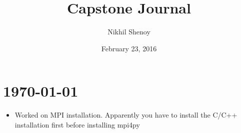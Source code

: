\documentclass{article}
\begin{document}
\title{Capstone Journal}
\author{Nikhil Shenoy}
\date{February 23, 2016}
\maketitle
\newpage

\section*{\today}
\begin{itemize}
	\item Worked on MPI installation. Apparently you have to install the C/C++ installation first before installing mpi4py
\end{itemize}
\end{document}
